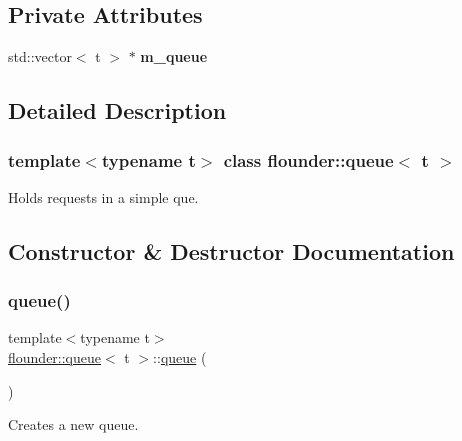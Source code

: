 \subsection*{Private Attributes}
\begin{DoxyCompactItemize}
\item 
\mbox{\label{classflounder_1_1queue_a0569e6435d1f9c10f6537d193e1a7b41}} 
std\+::vector$<$ t $>$ $\ast$ {\bfseries m\+\_\+queue}
\end{DoxyCompactItemize}


\subsection{Detailed Description}
\subsubsection*{template$<$typename t$>$\newline
class flounder\+::queue$<$ t $>$}

Holds requests in a simple que. 



\subsection{Constructor \& Destructor Documentation}
\mbox{\label{classflounder_1_1queue_a1ed42b04591cfd38e598b19acdae2251}} 
\subsubsection{\texorpdfstring{queue()}{queue()}}
{\footnotesize\ttfamily template$<$typename t$>$ \\
\hyperlink{classflounder_1_1queue}{flounder\+::queue}$<$ t $>$\+::\hyperlink{classflounder_1_1queue}{queue} (\begin{DoxyParamCaption}{ }\end{DoxyParamCaption})\hspace{0.3cm}{\ttfamily [inline]}}



Creates a new queue. 

\mbox{\label{classflounder_1_1queue_a924c72fe34b398ea2dc055402b8c4e4a}} 
